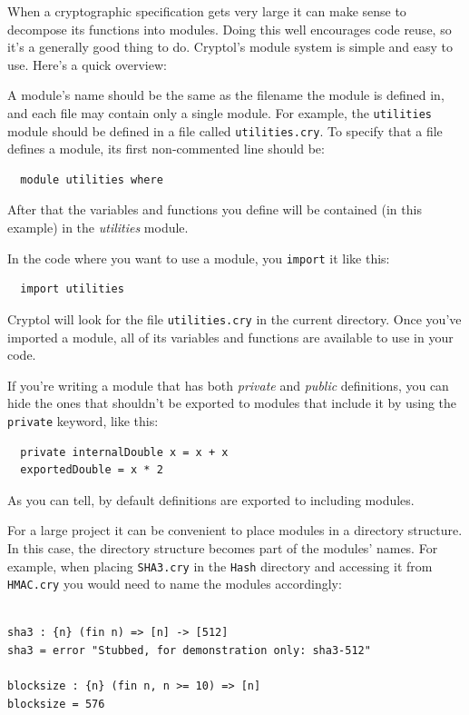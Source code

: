 When a cryptographic specification gets very large it can make sense
to decompose its functions into modules.\indModuleSystem\indImport
Doing this well encourages
code reuse, so it's a generally good thing to do. Cryptol's module
system is simple and easy to use. Here's a quick overview:

A module's name should be the same as the filename the module is defined in,
and each file may contain only a single module. For example, the
\verb+utilities+ module should be defined in a file called
\verb+utilities.cry+. To specify that a file defines a module, its first
non-commented line should be:

\begin{verbatim}
  module utilities where
\end{verbatim}

After that the variables and functions you define will be contained
(in this example) in the {\it utilities} module.

In the code where you want to use a module, you \verb+import+ it like this:
\begin{verbatim}
  import utilities
\end{verbatim}

Cryptol will look for the file \verb+utilities.cry+ in the current directory. Once you've imported a module, all of its variables and functions are available to use in your code.

If you're writing a module that has both {\it private} and {\it public}
definitions, you can hide the ones that shouldn't be exported to modules
that include it by using the \verb+private+ keyword, like this:\indPrivate

\begin{verbatim}
  private internalDouble x = x + x
  exportedDouble = x * 2
\end{verbatim}

As you can tell, by default definitions are exported to including modules.

For a large project it can be convenient to place modules in a directory
structure.  In this case, the directory structure becomes part of the modules'
names.  For example, when placing \verb+SHA3.cry+ in the \verb+Hash+ directory and
accessing it from \verb+HMAC.cry+ you would need to name the modules
accordingly:

\begin{verbatim}

sha3 : {n} (fin n) => [n] -> [512]
sha3 = error "Stubbed, for demonstration only: sha3-512"

blocksize : {n} (fin n, n >= 10) => [n]
blocksize = 576
\end{verbatim}

